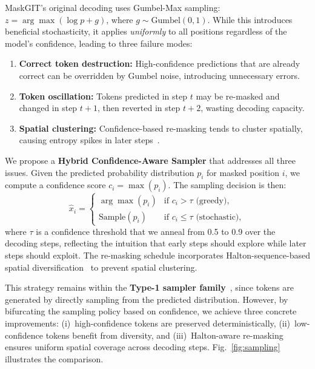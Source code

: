 \documentclass[conference]{IEEEtran}
\begin{document}
MaskGIT's original decoding uses Gumbel-Max sampling: $z = \arg\max(\log p + g)$, where $g \sim \text{Gumbel}(0,1)$. While this introduces beneficial stochasticity, it applies \textit{uniformly} to all positions regardless of the model's confidence, leading to three failure modes:

\begin{enumerate}
\item \textbf{Correct token destruction:} High-confidence predictions that are already correct can be overridden by Gumbel noise, introducing unnecessary errors.
\item \textbf{Token oscillation:} Tokens predicted in step $t$ may be re-masked and changed in step $t{+}1$, then reverted in step $t{+}2$, wasting decoding capacity.
\item \textbf{Spatial clustering:} Confidence-based re-masking tends to cluster spatially, causing entropy spikes in later steps~\cite{besnier2025halton}.
\end{enumerate}

We propose a \textbf{Hybrid Confidence-Aware Sampler} that addresses all three issues. Given the predicted probability distribution $p_i$ for masked position $i$, we compute a confidence score $c_i = \max(p_i)$. The sampling decision is then:
\begin{equation}
\hat{x}_i = \begin{cases}
\arg\max(p_i) & \text{if } c_i > \tau \text{ (greedy)}, \\
\text{Sample}(p_i) & \text{if } c_i \leq \tau \text{ (stochastic)},
\end{cases}
\label{eq:hybrid}
\end{equation}
where $\tau$ is a confidence threshold that we anneal from 0.5 to 0.9 over the decoding steps, reflecting the intuition that early steps should explore while later steps should exploit. The re-masking schedule incorporates Halton-sequence-based spatial diversification~\cite{besnier2025halton} to prevent spatial clustering.

This strategy remains within the \textbf{Type-1 sampler family}~\cite{hayakawa2025demystifying}, since tokens are generated by directly sampling from the predicted distribution. However, by bifurcating the sampling policy based on confidence, we achieve three concrete improvements: (i)~high-confidence tokens are preserved deterministically, (ii)~low-confidence tokens benefit from diversity, and (iii)~Halton-aware re-masking ensures uniform spatial coverage across decoding steps. Fig.~\ref{fig:sampling} illustrates the comparison.
\end{document}

